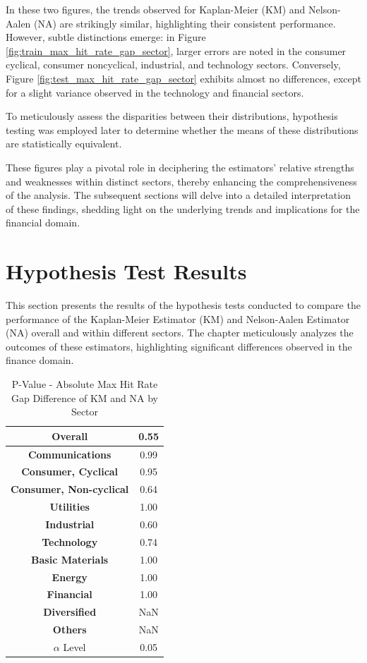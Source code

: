In these two figures, the trends observed for Kaplan-Meier (KM) and Nelson-Aalen (NA) are strikingly similar, highlighting their consistent performance. However, subtle distinctions emerge: in Figure \ref{fig:train_max_hit_rate_gap_sector}, larger errors are noted in the consumer cyclical, consumer noncyclical, industrial, and technology sectors. Conversely, Figure \ref{fig:test_max_hit_rate_gap_sector} exhibits almost no differences, except for a slight variance observed in the technology and financial sectors.

To meticulously assess the disparities between their distributions, hypothesis testing was employed later to determine whether the means of these distributions are statistically equivalent.

These figures play a pivotal role in deciphering the estimators' relative strengths and weaknesses within distinct sectors, thereby enhancing the comprehensiveness of the analysis. The subsequent sections will delve into a detailed interpretation of these findings, shedding light on the underlying trends and implications for the financial domain.

\section{Hypothesis Test Results}
This section presents the results of the hypothesis tests conducted to compare the performance of the Kaplan-Meier Estimator (KM) and Nelson-Aalen Estimator (NA) overall and within different sectors. The chapter meticulously analyzes the outcomes of these estimators, highlighting significant differences observed in the finance domain.

\begin{table}[H]
    \caption{P-Value - Absolute Max Hit Rate Gap Difference of KM and NA by Sector}
    \label{tab:pvalue_by_sector}
    \centering
    \begin{tabular}{|c|c|}
        \hline
        \textbf{Overall} & 0.55 \\
        \hline
        \textbf{Communications} & 0.99 \\
        \textbf{Consumer, Cyclical} & 0.95 \\
        \textbf{Consumer, Non-cyclical} & 0.64 \\
        \textbf{Utilities} & 1.00 \\
        \textbf{Industrial} & 0.60 \\
        \textbf{Technology} & 0.74 \\
        \textbf{Basic Materials} & 1.00 \\
        \textbf{Energy} & 1.00 \\
        \textbf{Financial} & 1.00 \\
        \textbf{Diversified} & NaN \\
        \textbf{Others} & NaN \\
        \hline
        $\alpha$ Level & 0.05\\
        \hline
    \end{tabular}
\end{table}

